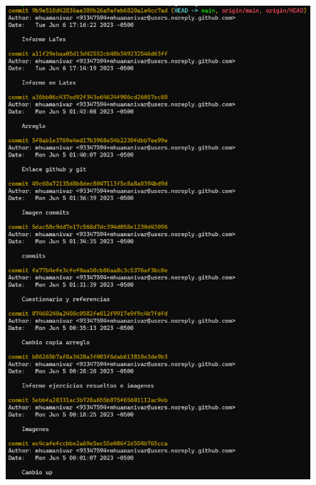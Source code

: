 \documentclass{article}
\begin{document}
\begin{minipage}{\linewidth}
  \centering
  \includegraphics[width=0.85\textwidth]{imagenes/commits1.png}
\end{minipage}

\pagebreak
\end{document}
